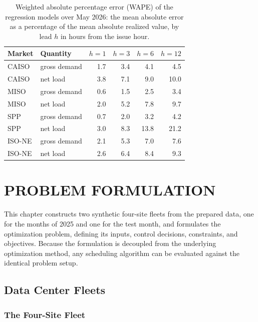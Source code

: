 \documentclass{UNCC-thesis}
\begin{document}
\begin{table}[htbp]
  \centering
  \footnotesize
  \caption[Forecast weighted absolute percentage error, May 2026]{Weighted absolute percentage
  error (WAPE) of the regression models over May 2026: the mean absolute error as a percentage
  of the mean absolute realized value, by lead \(h\) in hours from the issue hour.}
  \label{tab:forecast-accuracy-pct}
  \begin{tabular}{@{}llrrrr@{}}
    \toprule
    Market & Quantity & \(h=1\) & \(h=3\) & \(h=6\) & \(h=12\) \\
    \midrule
    CAISO  & gross demand & 1.7 & 3.4 & 4.1 & 4.5 \\
    CAISO  & net load     & 3.8 & 7.1 & 9.0 & 10.0 \\
    MISO   & gross demand & 0.6 & 1.5 & 2.5 & 3.4 \\
    MISO   & net load     & 2.0 & 5.2 & 7.8 & 9.7 \\
    SPP    & gross demand & 0.7 & 2.0 & 3.2 & 4.2 \\
    SPP    & net load     & 3.0 & 8.3 & 13.8 & 21.2 \\
    ISO-NE & gross demand & 2.1 & 5.3 & 7.0 & 7.6 \\
    ISO-NE & net load     & 2.6 & 6.4 & 8.4 & 9.3 \\
    \bottomrule
  \end{tabular}
\end{table}

\chapter{PROBLEM FORMULATION}
\label{chap:problem}

This chapter constructs two synthetic four-site fleets from the prepared data, one for the
months of 2025 and one for the test month, and formulates the optimization problem, defining
its inputs, control decisions, constraints, and objectives. Because the
formulation is decoupled from the underlying optimization method, any scheduling algorithm
can be evaluated against the identical problem setup.

\section{Data Center Fleets}
\label{sec:data-transformations}

\subsection{The Four-Site Fleet}
\label{subsec:transform-mapping}
\end{document}
